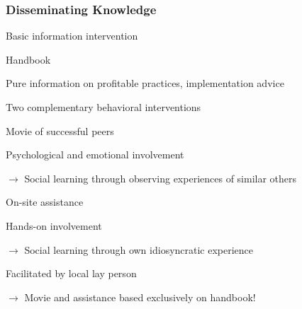\documentclass[hideothersubsections, usenames,dvipsnames,11pt]{beamer}
\newenvironment{itemize_2pt}{\itemize\addtolength{\itemsep}{2pt}}{\enditemize}
\begin{document}
\begin{frame}
\frametitle{Disseminating Knowledge}

Basic information intervention
	\begin{itemize_2pt}
		\item Handbook
		\begin{itemize_2pt}
			\item \textcolor{bdf}{Pure information} on profitable practices, implementation advice
		\end{itemize_2pt}
	\end{itemize_2pt}
	
	\vspace{1.0em}

Two complementary behavioral interventions
	\begin{itemize_2pt}
		\item Movie of successful peers
		\begin{itemize_2pt}
			\item \textcolor{bdf}{Psychological and emotional involvement}
			\item[] $\rightarrow$ Social learning through \textcolor{bdf}{observing experiences of similar others}
			\item[] \quad \citep[see,e.g.,][]{Bernard2014, Ferrara2012, Chong2009, Berg2017}
		\end{itemize_2pt}

		\item On-site assistance
			\begin{itemize_2pt}
				\item \textcolor{bdf}{Hands-on involvement}
				\item[] $\rightarrow$ Social learning through own \textcolor{bdf}{idiosyncratic experience}
				\item Facilitated by local lay person
			\end{itemize_2pt}
		\item[] $\rightarrow$ Movie and assistance based exclusively on handbook!

	\end{itemize_2pt}

\end{frame}
\end{document}
